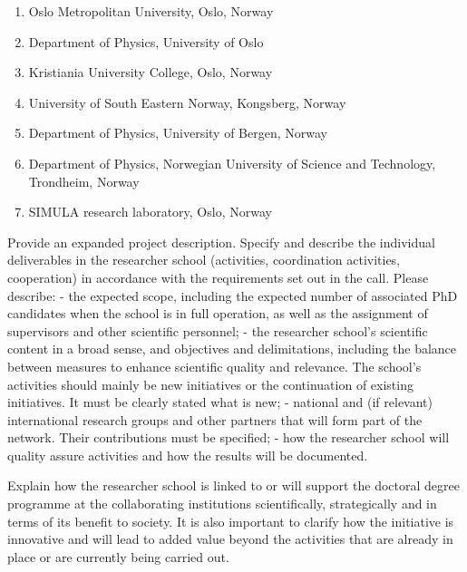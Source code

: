 \documentclass{scrreprt}
\begin{document}
\begin{enumerate}

\item Oslo Metropolitan University, Oslo, Norway

\item Department of Physics, University of Oslo

\item Kristiania University College, Oslo, Norway

\item University of South Eastern Norway, Kongsberg, Norway


\item Department of Physics, University of Bergen, Norway

\item Department of Physics, Norwegian University of Science and Technology, Trondheim, Norway

\item SIMULA research laboratory, Oslo, Norway

\end{enumerate}


Provide an expanded project description. Specify and describe the individual deliverables in the researcher school (activities, coordination activities, cooperation) in accordance with the requirements set out in the call. Please describe:
-	the expected scope, including the expected number of associated PhD candidates when the school is in full operation, as well as the assignment of supervisors and other scientific personnel;
-	the researcher school's scientific content in a broad sense, and objectives and delimitations, including the balance between measures to enhance scientific quality and relevance. The school’s activities should mainly be new initiatives or the continuation of existing initiatives. It must be clearly stated what is new;
-	national and (if relevant) international research groups and other partners that will form part of the network. Their contributions must be specified;
-	how the researcher school will quality assure activities and how the results will be documented.


Explain how the researcher school is linked to or will support the
doctoral degree programme at the collaborating institutions
scientifically, strategically and in terms of its benefit to
society. It is also important to clarify how the initiative is
innovative and will lead to added value beyond the activities that are
already in place or are currently being carried out.
\end{document}
